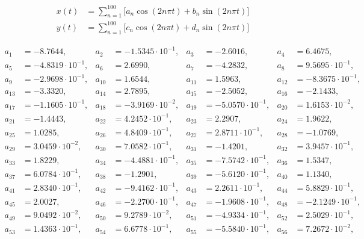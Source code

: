 \begin{align*}
x(t) &= \sum\limits_{n=1}^{ 100 } \Big[a_n \cos(2n\pi t) + b_n \sin(2n\pi t) \Big]\\ 
y(t) &= \sum\limits_{n=1}^{ 100 } \Big[c_n \cos(2n\pi t) + d_n \sin(2n\pi t) \Big]
\end{align*}

\begin{align*}
a_{ 1 } &= -8.7644, & a_{ 2 } &= -1.5345 \cdot 10^{ -1 }, & a_{ 3 } &= -2.6016, & a_{ 4 } &= 6.4675,\\ 
a_{ 5 } &= -4.8319 \cdot 10^{ -1 }, & a_{ 6 } &= 2.6990, & a_{ 7 } &= -4.2832, & a_{ 8 } &= 9.5695 \cdot 10^{ -1 },\\ 
a_{ 9 } &= -2.9698 \cdot 10^{ -1 }, & a_{ 10 } &= 1.6544, & a_{ 11 } &= 1.5963, & a_{ 12 } &= -8.3675 \cdot 10^{ -1 },\\ 
a_{ 13 } &= -3.3320, & a_{ 14 } &= 2.7895, & a_{ 15 } &= -2.5052, & a_{ 16 } &= -2.1433,\\ 
a_{ 17 } &= -1.1605 \cdot 10^{ -1 }, & a_{ 18 } &= -3.9169 \cdot 10^{ -2 }, & a_{ 19 } &= -5.0570 \cdot 10^{ -1 }, & a_{ 20 } &= 1.6153 \cdot 10^{ -2 },\\ 
a_{ 21 } &= -1.4443, & a_{ 22 } &= 4.2452 \cdot 10^{ -1 }, & a_{ 23 } &= 2.2907, & a_{ 24 } &= 1.9622,\\ 
a_{ 25 } &= 1.0285, & a_{ 26 } &= 4.8409 \cdot 10^{ -1 }, & a_{ 27 } &= 2.8711 \cdot 10^{ -1 }, & a_{ 28 } &= -1.0769,\\ 
a_{ 29 } &= 3.0459 \cdot 10^{ -2 }, & a_{ 30 } &= 7.0582 \cdot 10^{ -1 }, & a_{ 31 } &= -1.4201, & a_{ 32 } &= 3.9457 \cdot 10^{ -1 },\\ 
a_{ 33 } &= 1.8229, & a_{ 34 } &= -4.4881 \cdot 10^{ -1 }, & a_{ 35 } &= -7.5742 \cdot 10^{ -1 }, & a_{ 36 } &= 1.5347,\\ 
a_{ 37 } &= 6.0784 \cdot 10^{ -1 }, & a_{ 38 } &= -1.2901, & a_{ 39 } &= -5.6120 \cdot 10^{ -1 }, & a_{ 40 } &= 1.1340,\\ 
a_{ 41 } &= 2.8340 \cdot 10^{ -1 }, & a_{ 42 } &= -9.4162 \cdot 10^{ -1 }, & a_{ 43 } &= 2.2611 \cdot 10^{ -1 }, & a_{ 44 } &= 5.8829 \cdot 10^{ -1 },\\ 
a_{ 45 } &= 2.0027, & a_{ 46 } &= -2.2700 \cdot 10^{ -1 }, & a_{ 47 } &= -1.9608 \cdot 10^{ -1 }, & a_{ 48 } &= -2.1249 \cdot 10^{ -1 },\\ 
a_{ 49 } &= 9.0492 \cdot 10^{ -2 }, & a_{ 50 } &= 9.2789 \cdot 10^{ -2 }, & a_{ 51 } &= -4.9334 \cdot 10^{ -1 }, & a_{ 52 } &= 2.5029 \cdot 10^{ -1 },\\ 
a_{ 53 } &= 1.4363 \cdot 10^{ -1 }, & a_{ 54 } &= 6.6778 \cdot 10^{ -1 }, & a_{ 55 } &= -5.5840 \cdot 10^{ -1 }, & a_{ 56 } &= 7.2672 \cdot 10^{ -2 },\\ 

\end{align*}
